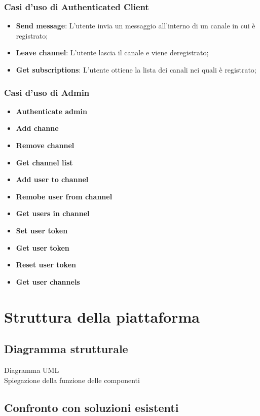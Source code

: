		\subsubsection{Casi d'uso di Authenticated Client}
		\begin{itemize}
			\item \textbf{Send message}: L'utente invia un messaggio all'interno di un canale in cui è registrato; 
			\item \textbf{Leave channel}: L'utente lascia il canale e viene deregistrato; 
			\item \textbf{Get subscriptions}: L'utente ottiene la lista dei canali nei quali è registrato; 
		\end{itemize}

		\subsubsection{Casi d'uso di Admin}
		\begin{itemize}
			\item \textbf{Authenticate admin}
			\item \textbf{Add channe}
			\item \textbf{Remove channel}
			\item \textbf{Get channel list}
			\item \textbf{Add user to channel}
			\item \textbf{Remobe user from channel}
			\item \textbf{Get users in channel}
			\item \textbf{Set user token}
			\item \textbf{Get user token}
			\item \textbf{Reset user token}
			\item \textbf{Get user channels}
		\end{itemize}
		

	 \section{Struttura della piattaforma}
	 \subsection{Diagramma strutturale}
	 Diagramma UML\\
	 Spiegazione della funzione delle componenti

	 \subsection{Confronto con soluzioni esistenti}
